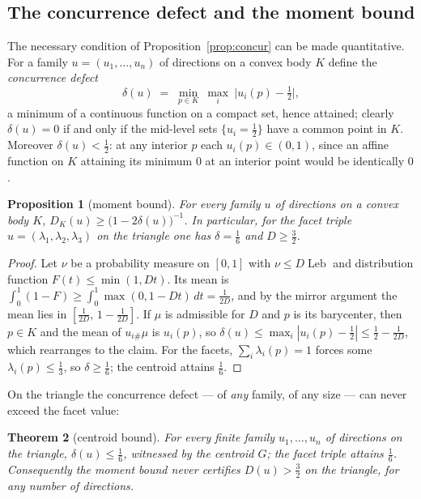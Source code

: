 \documentclass{aims}
\numberwithin{equation}{section}
\theoremstyle{plain}
\newtheorem{theorem}{Theorem}[section]
\newtheorem{proposition}[theorem]{Proposition}
\theoremstyle{definition}
\theoremstyle{remark}
\newcommand{\Leb}{\operatorname{Leb}}
\begin{document}
\subsection*{The concurrence defect and the moment bound}
The necessary condition of Proposition~\ref{prop:concur} can be made
quantitative. For a family $u=(u_1,\dots,u_n)$ of directions on a convex body
$K$ define the \emph{concurrence defect}
\begin{equation}\label{eq:cdefect}
\delta(u)\;=\;\min_{p\in K}\ \max_{i}\ \bigl|u_i(p)-\tfrac12\bigr|,
\end{equation}
a minimum of a continuous function on a compact set, hence attained; clearly
$\delta(u)=0$ if and only if the mid-level sets $\{u_i=\tfrac12\}$ have a
common point in $K$. Moreover $\delta(u)<\tfrac12$:
at any interior $p$ each $u_i(p)\in(0,1)$, since an affine function on $K$
attaining its minimum $0$ at an interior point would be identically $0$.

\begin{proposition}[moment bound]\label{prop:moment}
For every family $u$ of directions on a convex body $K$,
$D_K(u)\ge\bigl(1-2\delta(u)\bigr)^{-1}$. In particular, for the facet triple
$u=(\lambda_1,\lambda_2,\lambda_3)$ on the triangle one has $\delta=\tfrac16$
and $D\ge\tfrac32$.
\end{proposition}

\begin{proof}
Let $\nu$ be a probability measure on $[0,1]$ with $\nu\le D\Leb$ and
distribution function $F(t)\le\min(1,Dt)$. Its mean is
$\int_0^1(1-F)\ge\int_0^1\max(0,1-Dt)\,dt=\tfrac1{2D}$, and by the mirror
argument the mean lies in $[\tfrac1{2D},\,1-\tfrac1{2D}]$. If $\mu$ is
admissible for $D$ and $p$ is its barycenter, then $p\in K$ and the mean of
$u_{i\#}\mu$ is $u_i(p)$, so
$\delta(u)\le\max_i|u_i(p)-\tfrac12|\le\tfrac12-\tfrac1{2D}$, which rearranges
to the claim. For the facets, $\sum_i\lambda_i(p)=1$ forces some
$\lambda_i(p)\le\tfrac13$, so $\delta\ge\tfrac16$; the centroid attains
$\tfrac16$.
\end{proof}

On the triangle the concurrence defect --- of \emph{any} family, of any size
--- can never exceed the facet value:

\begin{theorem}[centroid bound]\label{thm:centroid}
For every finite family $u_1,\dots,u_n$ of directions on the triangle,
$\delta(u)\le\tfrac16$, witnessed by the centroid $G$; the facet triple attains
$\tfrac16$. Consequently the moment bound never certifies
$D(u)>\tfrac32$ on the triangle, for any number of directions.
\end{theorem}
\end{document}

